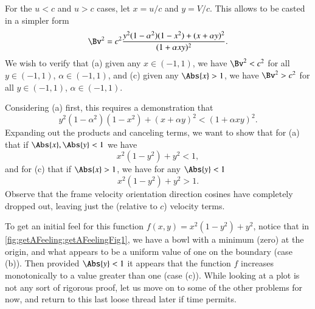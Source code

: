 {For the \(u < c\) and \(u > c\) cases, let \(x = u/c\) and \(y = V/c\).  This allows  to be casted in a simpler form
%
\begin{equation}\label{eqn:relativisticElectrodynamicsA1:270e}
\Bv^2 = c^2 \frac{y^2 (1 - \alpha^2)(1 - x^2) + (x + \alpha y)^2}{ (1 + \alpha x y)^2 }.
\end{equation}
%
We wish to verify that (a) given any \(x \in (-1,1)\), we have \(\Bv^2 < c^2\) for all \(y \in (-1,1)\), \(\alpha \in (-1,1)\), and (c) given any \(\Abs{x} > 1\), we have \(\Bv^2 > c^2\) for all \(y \in (-1,1)\), \(\alpha \in (-1,1)\).

Considering (a) first, this requires a demonstration that
%
\begin{equation}\label{eqn:relativisticElectrodynamicsA1:280}
y^2 (1 - \alpha^2)(1 - x^2) + (x + \alpha y)^2 < (1 + \alpha x y)^2 .
\end{equation}
%
Expanding out the products and canceling terms, we want to show that for (a) that if \(\Abs{x},\Abs{y} < 1\) we have
%
\begin{equation}\label{eqn:relativisticElectrodynamicsA1:290a}
x^2 (1 - y^2) + y^2 < 1,
\end{equation}
%
and for (c) that if \(\Abs{x} > 1\), we have for any \(\Abs{y} < 1\)
%
\begin{equation}\label{eqn:relativisticElectrodynamicsA1:290c}
x^2 (1 - y^2) + y^2 > 1.
\end{equation}
%
Observe that the frame velocity orientation direction cosines have completely dropped out, leaving just the (relative to \(c\)) velocity terms.

To get an initial feel for this function \(f(x,y) = x^2 (1 - y^2) + y^2\), notice that
in \cref{fig:getAFeeling:getAFeelingFig1},
we have a bowl with a minimum (zero) at the origin, and what appears to be a uniform value of one on the boundary (case (b)).  Then provided \(\Abs{y} < 1\) it appears that the function \(f\) increases monotonically to a value greater than one (case (c)).  While looking at a plot is not any sort of rigorous proof, let us move on to some of the other problems for now, and return to this last loose thread later if time permits.
} %
